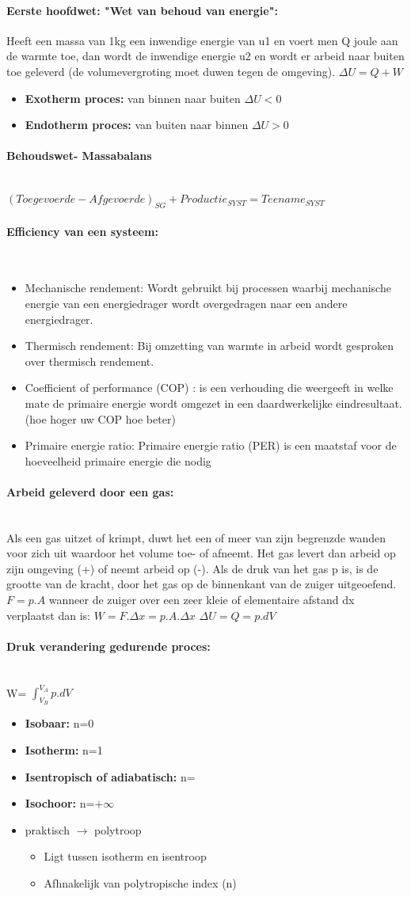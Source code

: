 \documentclass[12pt]{article}
\newcommand{\myparagraph}[1]{\paragraph{#1}\mbox{}\\}
\begin{document}
\paragraph{Eerste hoofdwet: "Wet van behoud van energie":}
Heeft een massa van 1kg een inwendige energie van u1 en voert men Q joule aan de warmte toe, dan wordt de inwendige energie u2 en wordt er arbeid naar buiten toe geleverd (de volumevergroting moet duwen tegen de omgeving).
$\Delta U=Q+W$
\begin{itemize}
    \item \textbf{Exotherm proces:} van binnen naar buiten $\Delta U < 0$
    \item \textbf{Endotherm proces:} van buiten naar binnen $\Delta U > 0$
\end{itemize}
\myparagraph{Behoudswet- Massabalans}
$(Toegevoerde-Afgevoerde)_{SG} + Productie_{SYST}=Teename_{SYST}$
\myparagraph{Efficiency van een systeem:}
\begin{itemize}
    \item Mechanische rendement: Wordt gebruikt bij processen waarbij mechanische energie van een energiedrager wordt overgedragen naar een andere energiedrager.
    \item Thermisch rendement: Bij omzetting van warmte in arbeid wordt gesproken over thermisch rendement.
    \item Coefficient of performance (COP) : is een verhouding die weergeeft in welke mate de primaire energie wordt omgezet in een daardwerkelijke eindresultaat. (hoe hoger uw COP hoe beter)
    \item Primaire energie ratio: Primaire energie ratio (PER) is een maatstaf voor de hoeveelheid primaire energie die nodig 
\end{itemize}
\myparagraph{Arbeid geleverd door een gas:}
Als een gas uitzet of krimpt, duwt het een of meer van zijn begrenzde wanden voor zich uit waardoor het volume toe- of afneemt. Het gas levert dan arbeid op zijn omgeving (+) of neemt arbeid op (-).\newline
Als de druk van het gas p is, is de grootte van de kracht, door het gas op de binnenkant van de zuiger uitgeoefend. $F =p.A$
wanneer de zuiger over een zeer kleie of elementaire afstand dx verplaatst dan is: $W=F.\Delta x=p.A.\Delta x$
$\Delta U= Q =p.dV$
\myparagraph{Druk verandering gedurende proces:}
W= \(\int_{V_{B}}^{V_{A}} p.dV\)
\begin{itemize}
    \item \textbf{Isobaar:} n=0
    \item \textbf{Isotherm:} n=1
    \item \textbf{Isentropisch of adiabatisch:} n=
    \item \textbf{Isochoor:} n=+$\infty$
    \item praktisch $\rightarrow$ polytroop\begin{itemize}
        \item Ligt tussen isotherm en isentroop
        \item Afhnakelijk van polytropische index (n)
    \end{itemize}
\end{itemize}
\end{document}
